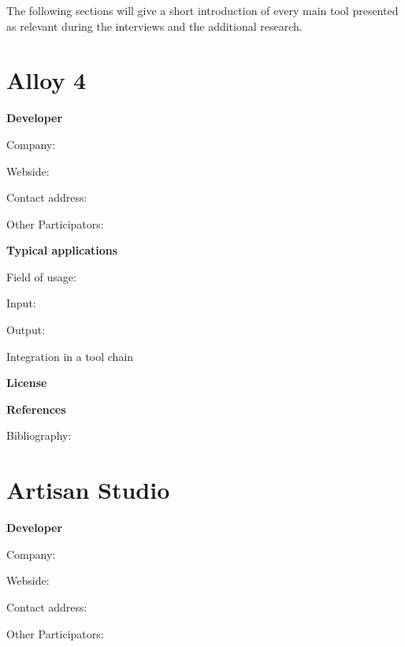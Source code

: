 \documentclass{./template/openetcs2}
\begin{document}
The following sections will give a short introduction of every main tool presented as relevant during the interviews and the additional research. 

\section{Alloy 4}


	\textbf{Developer}

	Company: 

	Webside:

	Contact address:

	Other  Participators:



	\textbf{Typical applications}

	Field of usage:


	Input:

	Output:





	Integration in a tool chain



	\textbf{License}


	\textbf{References}

	Bibliography:





\section{Artisan Studio}

	\textbf{Developer}

	Company: 

	Webside:

	Contact address:

	Other  Participators:
\end{document}
